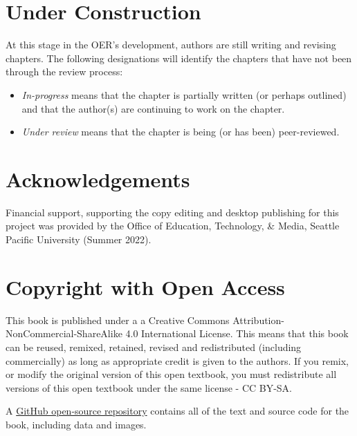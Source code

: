\documentclass[
  11pt,
]{book}
\providecommand{\tightlist}{%
  \setlength{\itemsep}{0pt}\setlength{\parskip}{0pt}}
\begin{document}
\hypertarget{under-construction}{%
\section*{Under Construction}\label{under-construction}}

At this stage in the OER's development, authors are still writing and revising chapters. The following designations will identify the chapters that have not been through the review process:

\begin{itemize}
\tightlist
\item
  \emph{In-progress} means that the chapter is partially written (or perhaps outlined) and that the author(s) are continuing to work on the chapter.
\item
  \emph{Under review} means that the chapter is being (or has been) peer-reviewed.
\end{itemize}

\hypertarget{acknowledgements}{%
\section*{Acknowledgements}\label{acknowledgements}}

Financial support, supporting the copy editing and desktop publishing for this project was provided by the Office of Education, Technology, \& Media, Seattle Pacific University (Summer 2022).

\hypertarget{copyright-with-open-access}{%
\section*{Copyright with Open Access}\label{copyright-with-open-access}}

This book is published under a a Creative Commons Attribution-NonCommercial-ShareAlike 4.0 International License. This means that this book can be reused, remixed, retained, revised and redistributed (including commercially) as long as appropriate credit is given to the authors. If you remix, or modify the original version of this open textbook, you must redistribute all versions of this open textbook under the same license - CC BY-SA.

A \href{https://github.com/lhbikos/ReC_MultivModel}{GitHub open-source repository} contains all of the text and source code for the book, including data and images.
\end{document}
